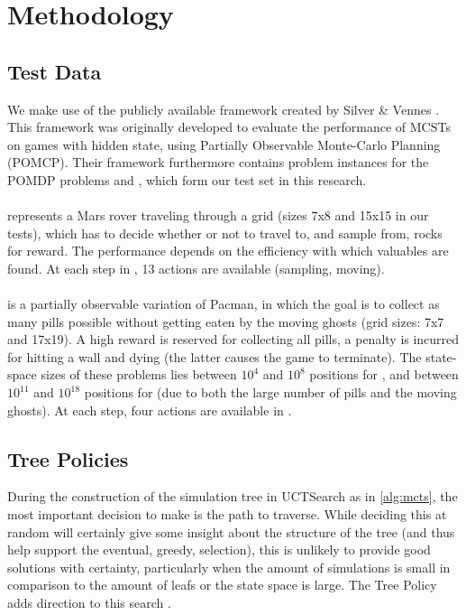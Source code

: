 
\section{Methodology}

\subsection{Test Data}
We make use of the publicly available framework created by Silver \& Vennes \cite{silver2010monte}. This framework was originally developed to evaluate the performance of MCSTs on games with hidden state, using Partially Observable Monte-Carlo Planning (POMCP). Their framework furthermore contains problem instances for  the POMDP problems \rock and \poc, which form our test set in this research. \\ \\
\rock represents a Mars rover traveling through a grid (sizes 7x8 and 15x15 in our tests), which has to decide whether or not to travel to, and sample from, rocks for reward. The performance depends on the efficiency with which valuables are found. At each step in \rock, 13 actions are available (\eg sampling, moving). \\ \\
\poc is a partially observable variation of Pacman, in which the goal is to collect as many pills possible without getting eaten by the moving ghosts (grid sizes: 7x7 and 17x19). A high reward is reserved for collecting all pills, a penalty is incurred for hitting a wall and dying (the latter causes the game to terminate). The state-space sizes of these problems lies between $10^4$ and $10^8$ positions for \rock, and between $10^{11}$ and $10^{18}$ positions for \poc (due to both the large number of pills and the moving ghosts). At each step, four actions are available in \poc.

\subsection{Tree Policies}
\label{sec:tp}

During the construction of the simulation tree in UCTSearch as in \ref{alg:mcts}, the most important decision to make is the path to traverse. While deciding this at random will certainly give some insight about the structure of the tree (and thus help support the eventual, greedy, selection), this is unlikely to provide good solutions with certainty, particularly when the amount of simulations is small in comparison to the amount of leafs or the state space is large. The Tree Policy adds direction to this search \cite{browne2012survey}. 


